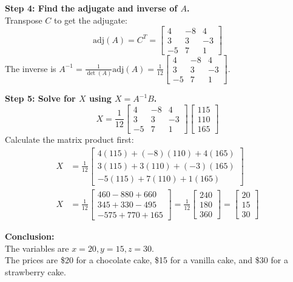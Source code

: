 \begin{solution}
\medskip
\textbf{Step 4: Find the adjugate and inverse of $A$.} \\
Transpose $C$ to get the adjugate:
\[
\text{adj}(A) = C^T = \begin{bmatrix} 4 & -8 & 4 \\ 3 & 3 & -3 \\ -5 & 7 & 1 \end{bmatrix}
\]
The inverse is $A^{-1} = \frac{1}{\det(A)}\text{adj}(A) = \frac{1}{12} \begin{bmatrix} 4 & -8 & 4 \\ 3 & 3 & -3 \\ -5 & 7 & 1 \end{bmatrix}$.

\medskip
\textbf{Step 5: Solve for $X$ using $X = A^{-1}B$.}
\[
X = \frac{1}{12} \begin{bmatrix} 4 & -8 & 4 \\ 3 & 3 & -3 \\ -5 & 7 & 1 \end{bmatrix} \begin{bmatrix} 115 \\ 110 \\ 165 \end{bmatrix}
\]
Calculate the matrix product first:
\begin{align*}
X &= \frac{1}{12} \begin{bmatrix} 4(115) + (-8)(110) + 4(165) \\ 3(115) + 3(110) + (-3)(165) \\ -5(115) + 7(110) + 1(165) \end{bmatrix} \\[6pt]
X &= \frac{1}{12} \begin{bmatrix} 460 - 880 + 660 \\ 345 + 330 - 495 \\ -575 + 770 + 165 \end{bmatrix} = \frac{1}{12} \begin{bmatrix} 240 \\ 180 \\ 360 \end{bmatrix} = \begin{bmatrix} 20 \\ 15 \\ 30 \end{bmatrix}
\end{align*}

\medskip
\textbf{Conclusion:} \\
The variables are $x=20, y=15, z=30$. \\
The prices are \$20 for a chocolate cake, \$15 for a vanilla cake, and \$30 for a strawberry cake.
\end{solution}

